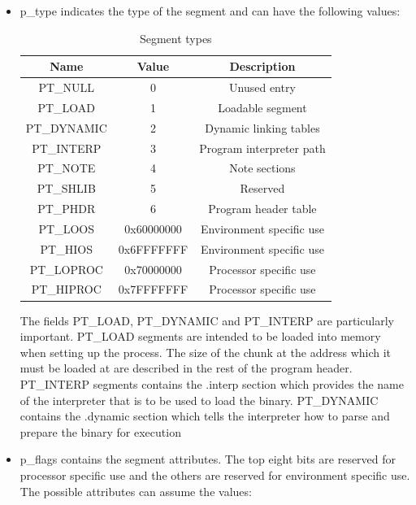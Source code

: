 \begin{itemize}
    \item {\ttfamily p\_type} indicates the type of the segment and can have the following values:
    \begin{table}[!htbp]
        \begin{center}
            \begin{tabular}{|c|c|c|}
                \hline \textbf{Name} & \textbf{Value} &  \textbf{Description}\\
                \hline {\ttfamily PT\_NULL} & 0 & Unused entry\\
                \hline {\ttfamily PT\_LOAD} & 1 & Loadable segment\\
                \hline {\ttfamily PT\_DYNAMIC} & 2 & Dynamic linking tables\\
                \hline {\ttfamily PT\_INTERP} & 3 & Program interpreter path\\
                \hline {\ttfamily PT\_NOTE} & 4 & Note sections\\
                \hline {\ttfamily PT\_SHLIB} & 5 & Reserved\\
                \hline {\ttfamily PT\_PHDR} & 6 & Program header table\\
                \hline {\ttfamily PT\_LOOS} & 0x60000000 & Environment specific use\\
                \hline {\ttfamily PT\_HIOS} & 0x6FFFFFFF & Environment specific use\\
                \hline {\ttfamily PT\_LOPROC} & 0x70000000 & Processor specific use\\
                \hline {\ttfamily PT\_HIPROC} & 0x7FFFFFFF & Processor specific use\\
                \hline 
            \end{tabular}
        \caption{Segment types}
        \label{segtypes}
        \end{center}
    \end{table}
    The fields {\ttfamily PT\_LOAD}, {\ttfamily PT\_DYNAMIC} and {\ttfamily PT\_INTERP} are particularly important.  {\ttfamily PT\_LOAD} segments are intended to be loaded into memory when setting up the process. The size of the chunk at the address which it must be loaded at are described in the rest of the program header.  {\ttfamily PT\_INTERP} segments contains the {\ttfamily .interp} section which provides the name of the interpreter that is to be used to load the binary.  {\ttfamily PT\_DYNAMIC} contains the {\ttfamily .dynamic} section which tells the interpreter how to parse and prepare the binary for execution \item {\ttfamily p\_flags} contains the segment attributes. The top eight bits are reserved for processor specific use and the others are reserved for environment specific use. The possible attributes can assume the values: 

\end{itemize}
